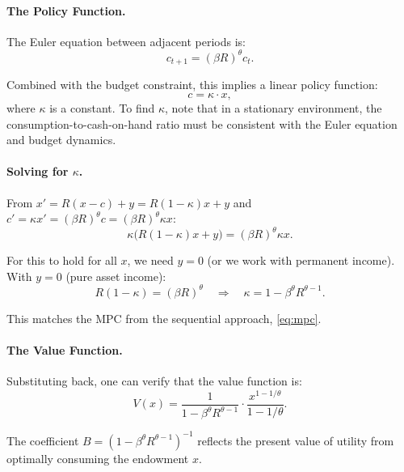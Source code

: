 \paragraph{The Policy Function.}
The Euler equation between adjacent periods is:
\begin{equation}
c_{t+1} = (\beta R)^\theta c_t.
\label{eq:euler-dp}
\end{equation}

Combined with the budget constraint, this implies a linear policy function:
\begin{equation}
c = \kappa \cdot x,
\label{eq:policy-linear}
\end{equation}
where $\kappa$ is a constant. To find $\kappa$, note that in a stationary environment, the consumption-to-cash-on-hand ratio must be consistent with the Euler equation and budget dynamics.

\paragraph{Solving for $\kappa$.}
From $x' = R(x - c) + y = R(1 - \kappa)x + y$ and $c' = \kappa x' = (\beta R)^\theta c = (\beta R)^\theta \kappa x$:
\begin{equation}
\kappa \bigl( R(1 - \kappa)x + y \bigr) = (\beta R)^\theta \kappa x.
\label{eq:kappa-equation}
\end{equation}

For this to hold for all $x$, we need $y = 0$ (or we work with permanent income). With $y = 0$ (pure asset income):
\begin{equation}
R(1 - \kappa) = (\beta R)^\theta \quad \Longrightarrow \quad \kappa = 1 - \beta^\theta R^{\theta - 1}.
\label{eq:kappa-solution}
\end{equation}

This matches the MPC from the sequential approach, \cref{eq:mpc}.

\paragraph{The Value Function.}
Substituting back, one can verify that the value function is:
\begin{equation}
V(x) = \frac{1}{1 - \beta^\theta R^{\theta - 1}} \cdot \frac{x^{1 - 1/\theta}}{1 - 1/\theta}.
\label{eq:value-function}
\end{equation}

The coefficient $B = (1 - \beta^\theta R^{\theta - 1})^{-1}$ reflects the present value of utility from optimally consuming the endowment $x$.

